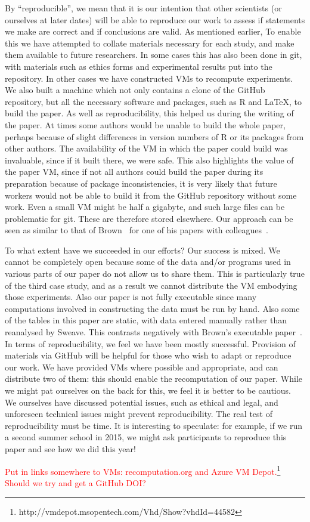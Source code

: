 By ``reproducible'', we mean that it is our intention that other scientists (or
ourselves at later dates) will be able to reproduce our work to assess if
statements we make are correct and if conclusions are valid.  
As mentioned earlier, 
To enable this we
have attempted to collate materials necessary for each study, and make them
available to future researchers.  
In some cases this has also been done in git,
with materials such as ethics forms and experimental results put into the repository.  
In other cases we have constructed VMs to recompute experiments.  
We also built a machine which not only contains a clone of the GitHub repository, but all the necessary software and packages, such as R and \LaTeX, to build the paper.
As well as reproducibility, this helped us during the writing of the paper.  At times some authors would be unable to build the whole paper, perhaps because of slight differences in version numbers of R or its packages from other authors.  The availability of the VM in which the paper could build was invaluable, since if it built there, we were safe.  This also highlights the value of the paper VM, since if not all authors could build the paper during its preparation because of package inconsistencies, it is very likely that future workers would not be able to build it from the GitHub repository without some work.
Even a small VM 
might be half a gigabyte, and such large files can be problematic for git.
These are therefore stored elsewhere.  
Our approach can be seen as similar to that of Brown~\cite{brown} for one of his papers with colleagues~\cite{Brown2012}.


To what extent have we succeeded in our efforts?
Our success is mixed.  We cannot be completely open because
some of the data and/or programs used in various parts of our paper do not allow us to share them.  This is particularly true of the third case study, and as a result we cannot distribute the VM embodying those experiments. Also our paper is not fully executable since 
many computations involved in constructing the data must be run by hand.  Also some of the tables in this paper are static, with data entered manually rather than reanalysed by Sweave. This contrasts negatively with Brown's executable paper~\cite{brown}.  
In terms of reproducibility, we feel we have been mostly successful.  
Provision of materials via GitHub will be helpful for those who wish to adapt or reproduce our work.
We have provided VMs where possible and appropriate, and can distribute two of them: this should enable the recomputation of our paper.  
While we might pat ourselves on the back for this, we feel it is better to be cautious. We ourselves have discussed potential issues, such as ethical and legal, and unforeseen technical issues might prevent reproducibility. The real test of reproducibility must be time.
It is interesting to speculate: for example, if we run a second summer school in 2015, we might ask participants to reproduce this paper and see how we did this year!

\textcolor{red}{Put in links somewhere to VMs: recomputation.org and Azure VM Depot.\footnote{http://vmdepot.msopentech.com/Vhd/Show?vhdId=44582} Should we try and get a GitHub DOI?}


